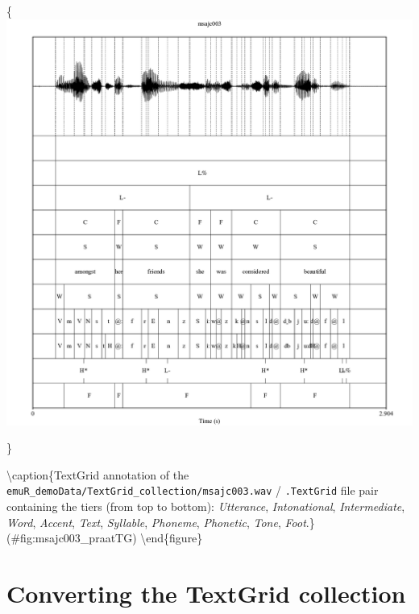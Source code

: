 \documentclass[]{book}
\theoremstyle{definition}
\theoremstyle{definition}
\theoremstyle{definition}
\theoremstyle{remark}
\begin{document}
\{\centering \includegraphics[width=0.85\linewidth]{pics/msajc003_praat}

\}

\textbackslash{}caption\{TextGrid annotation of the
\texttt{emuR\_demoData/TextGrid\_collection/msajc003.wav} /
\texttt{.TextGrid} file pair containing the tiers (from top to bottom):
\emph{Utterance}, \emph{Intonational}, \emph{Intermediate}, \emph{Word},
\emph{Accent}, \emph{Text}, \emph{Syllable}, \emph{Phoneme},
\emph{Phonetic}, \emph{Tone}, \emph{Foot}.\}(\#fig:msajc003\_praatTG)
\textbackslash{}end\{figure\}

\hypertarget{converting-the-textgrid-collection}{%
\section{Converting the TextGrid
collection}\label{converting-the-textgrid-collection}}
\end{document}
